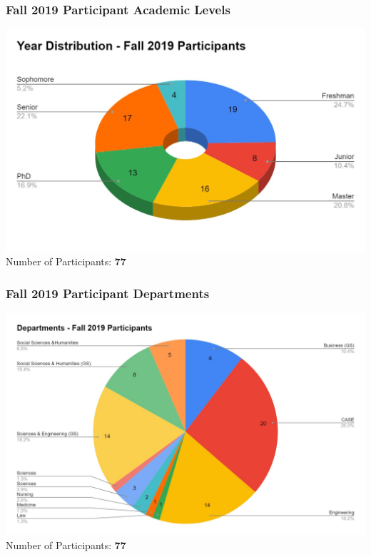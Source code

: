       \begin{frame}
        \frametitle{Fall 2019 Participant Academic Levels}
        \centering
        \includegraphics[height=0.75\textheight]{images/year_distribution_selected_fall2019.jpg}
        \LARGE
        \\
        Number of Participants: \textbf{77}
      \end{frame}

      \begin{frame}
        \frametitle{Fall 2019 Participant Departments}
        \centering
        \includegraphics[height=0.75\textheight]{images/departments_selected_fall2019.jpg}
        \LARGE
        \\
        Number of Participants: \textbf{77}
      \end{frame}


